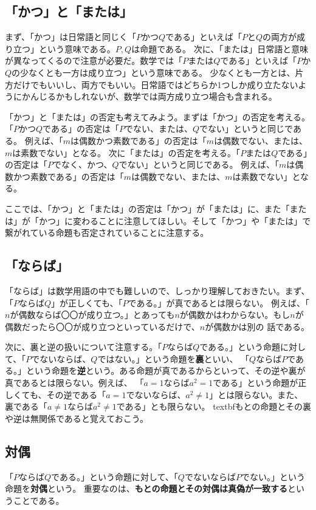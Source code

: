 \documentclass{jlreq}
\begin{document}
\subsection{「かつ」と「または」}
まず、「かつ」は日常語と同じく「$P$かつ$Q$である」といえば「$P$と$Q$の両方が成り立つ」という意味である。$P, Q$は命題である。
次に、「または」日常語と意味が異なってくるので注意が必要だ。数学では「$P$または$Q$である」といえば「$P$か$Q$の少なくとも一方は成り立つ」という意味である。
少なくとも一方とは、片方だけでもいいし、両方でもいい。日常語ではどちらか1つしか成り立たないようにかんじるかもしれないが、数学では両方成り立つ場合も含まれる。

「かつ」と「または」の否定も考えてみよう。まずは「かつ」の否定を考える。「$P$かつ$Q$である」の否定は「$P$でない、または、$Q$でない」というと同じである。
例えば、「$m$は偶数かつ素数である」の否定は「$m$は偶数でない、または、$m$は素数でない」となる。
次に「または」の否定を考える。「$P$または$Q$である」の否定は「$P$でなく、かつ、$Q$でない」というと同じである。
例えば、「$m$は偶数かつ素数である」の否定は「$m$は偶数でない、または、$m$は素数でない」となる。

ここでは、「かつ」と「または」の否定は「かつ」が「または」に、また「または」が「かつ」に変わることに注意してほしい。そして「かつ」や「または」で
繋がれている命題も否定されていることに注意する。

\subsection{「ならば」}
「ならば」は数学用語の中でも難しいので、しっかり理解しておきたい。まず、「$P$ならば$Q$」が正しくても、「$P$である。」が真であるとは限らない。
例えば、「$n$が偶数ならば〇〇が成り立つ。」とあっても$n$が偶数かはわからない。もし$n$が偶数だったら〇〇が成り立つといっているだけで、$n$が偶数かは別の
話である。

次に、裏と逆の扱いについて注意する。「$P$ならば$Q$である。」という命題に対して、「$P$でないならば、$Q$ではない。」という命題を\textbf{裏}といい、
「$Q$ならば$P$である。」という命題を\textbf{逆}という。ある命題が真であるからといって、その逆や裏が真であるとは限らない。例えば、
「$a = 1$ならば$a^2 = 1$である」という命題が正しくても、その逆である「$a=1$でないならば、$a^2 \neq 1$」とは限らない。また、裏である「$a \neq 1$ならば$a^2 \neq 1$である」とも限らない。
textbf{もとの命題とその裏や逆は無関係である}と覚えておこう。

\subsection{対偶}
「$P$ならば$Q$である。」という命題に対して、「$Q$でないならば$P$でない。」という命題を\textbf{対偶}という。
重要なのは、\textbf{もとの命題とその対偶は真偽が一致する}ということである。
\end{document}
